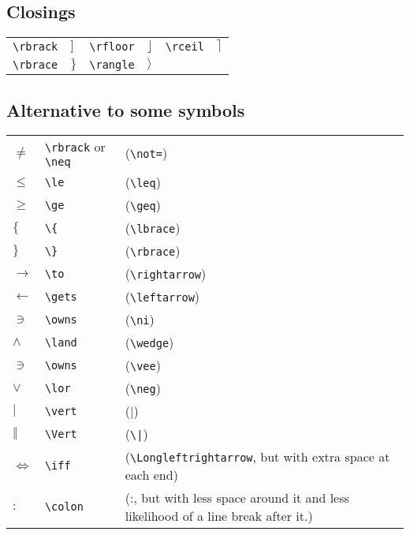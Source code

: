 \subsection{Closings}
\begin{table}[!htbp]
    \centering
    \begin{tabular}{lp{2cm}lp{2cm}lp{2cm}}
	\verb|\rbrack|	& $\rbrack$ &
	\verb|\rfloor|	& $\rfloor$ &
	\verb|\rceil|	& $\rceil$  \\
	\verb|\rbrace|	& $\rbrace$ &
	\verb|\rangle|	& $\rangle$ &
	&   \\
    \end{tabular}
\end{table}

\subsection{Alternative to some symbols}
\begin{table}[H]
    \centering
    \begin{tabular}{lll}
	$\ne$	    & \verb|\rbrack| or \verb|\neq| & (\verb|\not=|)	\\
	$\le$	    & \verb|\le|    & (\verb|\leq|)	\\
	$\ge$	    & \verb|\ge|    & (\verb|\geq|)	\\
	$\{$	    & \verb|\{|	    & (\verb|\lbrace|)	\\
	$\}$	    & \verb|\}|	    & (\verb|\rbrace|)	\\
	$\to$	    & \verb|\to|    & (\verb|\rightarrow|)	\\
	$\gets$	    & \verb|\gets|  & (\verb|\leftarrow|)	\\
	$\owns$	    & \verb|\owns|  & (\verb|\ni|)	\\
	$\land$	    & \verb|\land|  & (\verb|\wedge|)	\\
	$\owns$	    & \verb|\owns|  & (\verb|\vee|)	\\
	$\lor$	    & \verb|\lor|   & (\verb|\neg|)	\\
	$\vert$	    & \verb|\vert|  & (|)	\\
	$\Vert$	    & \verb|\Vert|  & (\verb/\|/)	\\
	$\iff$	    & \verb|\iff|   & (\verb|\Longleftrightarrow|, but with extra space at each end)	\\
	$\colon$    & \verb|\colon| & (:, but with less space around it and less likelihood of a line break after it.)	\\
    \end{tabular}
\end{table}

